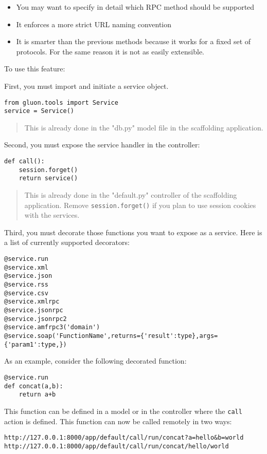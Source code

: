 \documentclass[justified,sixbynine,notoc]{tufte-book}
\def\ft{\small\tt}
\begin{document}
\begin{fullwidth}
\begin{itemize}
\item You may want to specify in detail which RPC method should be supported

\item It enforces a more strict URL naming convention

\item It is smarter than the previous methods because it works for a fixed set of protocols. For the same reason it is not as easily extensible.
\end{itemize}

To use this feature:

First, you must import and initiate a service object.
\begin{lstlisting}
from gluon.tools import Service
service = Service()
\end{lstlisting}

\begin{quote}This is already done in the "db.py" model file in the scaffolding application.\end{quote}
Second, you must expose the service handler in the controller:
\begin{lstlisting}
def call():
    session.forget()
    return service()
\end{lstlisting}

\begin{quote}This is already done in the "default.py" controller of the scaffolding application. Remove {\ft session.forget()} if you plan to use session cookies with the services.\end{quote}
Third, you must decorate those functions you want to expose as a service. Here is a list of currently supported decorators:
\begin{lstlisting}
@service.run
@service.xml
@service.json
@service.rss
@service.csv
@service.xmlrpc
@service.jsonrpc
@service.jsonrpc2
@service.amfrpc3('domain')
@service.soap('FunctionName',returns={'result':type},args={'param1':type,})
\end{lstlisting}

As an example, consider the following decorated function:
\begin{lstlisting}
@service.run
def concat(a,b):
    return a+b
\end{lstlisting}

This function can be defined in a model or in the controller where the {\ft call} action is defined. This function can now be called remotely in two ways:

\begin{lstlisting}[keywords={}]
http://127.0.0.1:8000/app/default/call/run/concat?a=hello&b=world
http://127.0.0.1:8000/app/default/call/run/concat/hello/world
\end{lstlisting}


\end{fullwidth}
\end{document}
